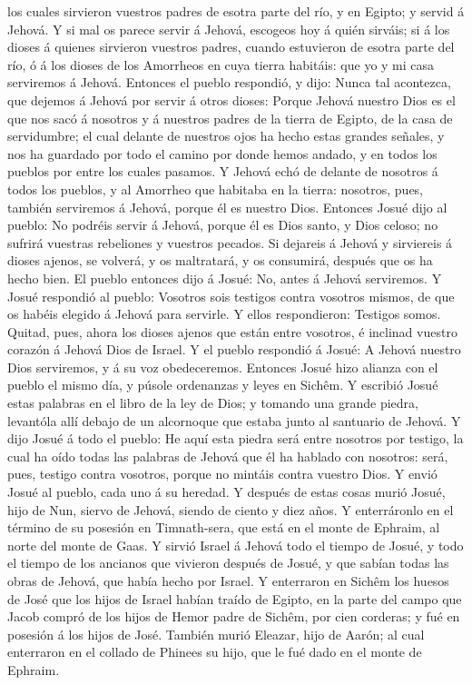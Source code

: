 los cuales sirvieron vuestros padres de esotra parte del río, y en
Egipto; y servid á Jehová.  Y si mal os parece servir á
Jehová, escogeos hoy á quién sirváis; si á los dioses á quienes
sirvieron vuestros padres, cuando estuvieron de esotra parte del río, ó
á los dioses de los Amorrheos en cuya tierra habitáis: que yo y mi casa
serviremos á Jehová.  Entonces el pueblo respondió, y dijo:
Nunca tal acontezca, que dejemos á Jehová por servir á otros dioses:
 Porque Jehová nuestro Dios es el que nos sacó á nosotros y
á nuestros padres de la tierra de Egipto, de la casa de servidumbre; el
cual delante de nuestros ojos ha hecho estas grandes señales, y nos ha
guardado por todo el camino por donde hemos andado, y en todos los
pueblos por entre los cuales pasamos.  Y Jehová echó de
delante de nosotros á todos los pueblos, y al Amorrheo que habitaba en
la tierra: nosotros, pues, también serviremos á Jehová, porque él es
nuestro Dios.  Entonces Josué dijo al pueblo: No podréis
servir á Jehová, porque él es Dios santo, y Dios celoso; no sufrirá
vuestras rebeliones y vuestros pecados.  Si dejareis á
Jehová y sirviereis á dioses ajenos, se volverá, y os maltratará, y os
consumirá, después que os ha hecho bien.  El pueblo
entonces dijo á Josué: No, antes á Jehová serviremos.  Y
Josué respondió al pueblo: Vosotros sois testigos contra vosotros
mismos, de que os habéis elegido á Jehová para servirle. Y ellos
respondieron: Testigos somos.  Quitad, pues, ahora los
dioses ajenos que están entre vosotros, é inclinad vuestro corazón á
Jehová Dios de Israel.  Y el pueblo respondió á Josué: A
Jehová nuestro Dios serviremos, y á su voz obedeceremos. 
Entonces Josué hizo alianza con el pueblo el mismo día, y púsole
ordenanzas y leyes en Sichêm.  Y escribió Josué estas
palabras en el libro de la ley de Dios; y tomando una grande piedra,
levantóla allí debajo de un alcornoque que estaba junto al santuario de
Jehová.  Y dijo Josué á todo el pueblo: He aquí esta piedra
será entre nosotros por testigo, la cual ha oído todas las palabras de
Jehová que él ha hablado con nosotros: será, pues, testigo contra
vosotros, porque no mintáis contra vuestro Dios.  Y envió
Josué al pueblo, cada uno á su heredad.  Y después de estas
cosas murió Josué, hijo de Nun, siervo de Jehová, siendo de ciento y
diez años.  Y enterráronlo en el término de su posesión en
Timnath-sera, que está en el monte de Ephraim, al norte del monte de
Gaas.  Y sirvió Israel á Jehová todo el tiempo de Josué, y
todo el tiempo de los ancianos que vivieron después de Josué, y que
sabían todas las obras de Jehová, que había hecho por Israel.
 Y enterraron en Sichêm los huesos de José que los hijos de
Israel habían traído de Egipto, en la parte del campo que Jacob compró
de los hijos de Hemor padre de Sichêm, por cien corderas; y fué en
posesión á los hijos de José.  También murió Eleazar, hijo
de Aarón; al cual enterraron en el collado de Phinees su hijo, que le
fué dado en el monte de Ephraim.
